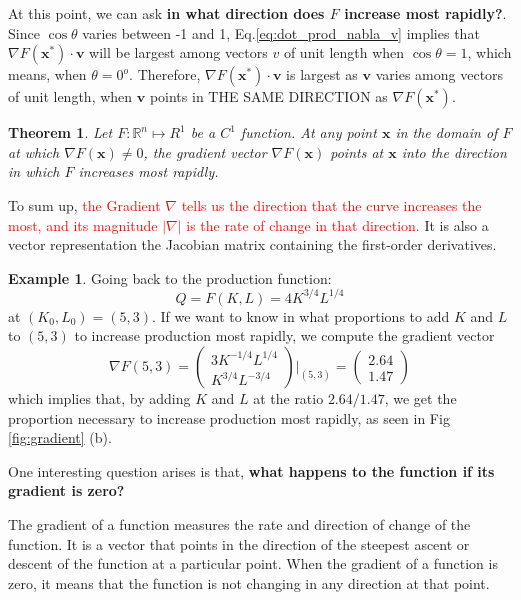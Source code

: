 \documentclass[10pt,a4paper]{book}
\newcommand{\red}[1]{\textcolor{red}{#1}}
\newtheorem{theorem}{Theorem}[section]
\theoremstyle{definition}\newtheorem{definition}{Definition}
\theoremstyle{definition}\newtheorem{fact}{Fact}
\theoremstyle{definition}\newtheorem{ex}{Ex.}
\theoremstyle{definition}\newtheorem{project}{Project}
\theoremstyle{definition}\newtheorem{problem}{Problem}
\theoremstyle{definition}\newtheorem{example}{Example}
\numberwithin{theorem}{chapter}
\numberwithin{corollary}{chapter}
\numberwithin{assumption}{chapter}
\numberwithin{definition}{chapter}
\numberwithin{prop}{chapter}
\numberwithin{notation}{chapter}
\numberwithin{problem}{chapter}
\numberwithin{example}{chapter}
\numberwithin{fact}{chapter}
\numberwithin{ex}{chapter}
\def\R{\mathbb R}
\def\R{\mathbb R}
\def\v{\mathbf v}
\def\x{\mathbf x}
\begin{document}
	
	At this point, we can ask \textbf{in what direction does $F$ increase most rapidly?}. Since $\cos\theta$ varies between -1 and 1, Eq.\eqref{eq:dot_prod_nabla_v} implies that $\nabla F(\x^*)\cdot \v$ will be largest among vectors $v$ of unit length when $\cos \theta=1$, which means, when $\theta=0^o$. Therefore, $\nabla F(\x^*)\cdot \v$ is largest as $\v$ varies among vectors of unit length, when $\v$ points in THE SAME DIRECTION as $\nabla F(\x^*)$. 
	
	\begin{theorem}
		Let $F: \R^n \mapsto R^1$ be a $C^1$ function. At any point $\x$ in the domain of $F$ at which $\nabla F(\x)\neq 0$, the gradient vector $\nabla F(\x)$ points at $\x$ into the direction in which $F$ increases most rapidly.
	\end{theorem}
	
	To sum up, \red{the Gradient $\nabla$ tells us the direction that the curve increases the most, and its magnitude $|\nabla |$ is the rate of change in that direction.} It is also a vector representation the Jacobian matrix containing the first-order derivatives.
	
	\begin{example}
		Going back to the production function:
		\begin{equation*}
			Q = F(K,L) = 4 K^{3/4} L^{1/4}
		\end{equation*}
		at $(K_0,L_0)= (5,3)$. If we want to know in what proportions to add $K$ and $L$ to $(5,3)$ to increase production most rapidly, we compute the gradient vector
		\begin{equation*}
			\nabla F(5,3) = \begin{pmatrix} 3K^{-1/4} L^{1/4} \\ K^{3/4}L^{-3/4} \end{pmatrix} |_{(5,3)} = \begin{pmatrix}
				2.64 \\
				1.47
			\end{pmatrix}
		\end{equation*}
		which implies that, by adding $K$ and $L$ at the ratio $2.64 / 1.47$, we get the proportion necessary to increase production most rapidly, as seen in Fig \ref{fig:gradient} (b).
	\end{example}
	
	One interesting question arises is that, \textbf{what happens to the function if its gradient is zero?}
	
	The gradient of a function measures the rate and direction of change of the function. It is a vector that points in the direction of the steepest ascent or descent of the function at a particular point. When the gradient of a function is zero, it means that the function is not changing in any direction at that point.
	
\end{document}
